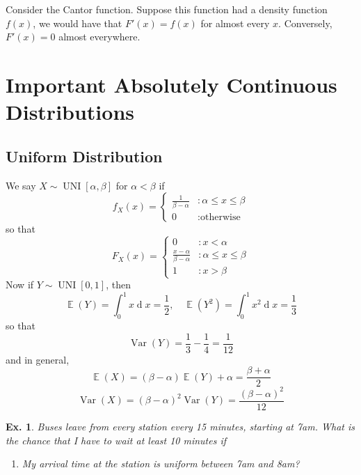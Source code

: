 \documentclass[12pt, a4paper]{book}
\DeclareMathOperator{\E}{\mathbb{E}}
\DeclareMathOperator{\Var}{Var}
\renewcommand{\d}[1]{\ensuremath{\operatorname{d}\!{#1}}} %
\newtheorem{example}[theorem]{Ex.}
\theoremstyle{nonumberplain}
\begin{document}
Consider the Cantor function.
Suppose this function had a density function $f(x)$, we would have that $F'(x)=f(x)$ for almost every $x$.
Conversely, $F'(x)=0$ almost everywhere.
\section{Important Absolutely Continuous Distributions}
\subsection{Uniform Distribution}
We say $X\sim\operatorname{UNI}[\alpha,\beta]$ for $\alpha<\beta$ if
\[f_X(x)=
    \begin{cases}
        \frac{1}{\beta-\alpha} &:\alpha\leq x\leq\beta\\
        0 &:\text{otherwise}
    \end{cases}
\]
so that
\[F_X(x)=
    \begin{cases}
        0 &:x <\alpha\\
        \frac{x-\alpha}{\beta-\alpha} &:\alpha\leq x\leq\beta\\
        1 &:x >\beta
    \end{cases}
\]
Now if $Y\sim\operatorname{UNI}[0,1]$, then
\[\E(Y)=\int_0^1 x\d{x}=\frac{1}{2},\quad\E(Y^2)=\int_0^1 x^2\d{x}=\frac{1}{3}\]
so that
\[\Var(Y)=\frac{1}{3}-\frac{1}{4}=\frac{1}{12}\]
and in general,
\[\E(X)=(\beta-\alpha)\E(Y)+\alpha=\frac{\beta+\alpha}{2}\]
\[\Var(X)=(\beta-\alpha)^2\Var(Y)=\frac{(\beta-\alpha)^2}{12}\]
\begin{example}
    Buses leave from every station every 15 minutes, starting at 7am.
    What is the chance that I have to wait at least 10 minutes if
    \begin{enumerate}
        \item My arrival time at the station is uniform between 7am and 8am?
    \end{enumerate}
\end{example}
\end{document}
